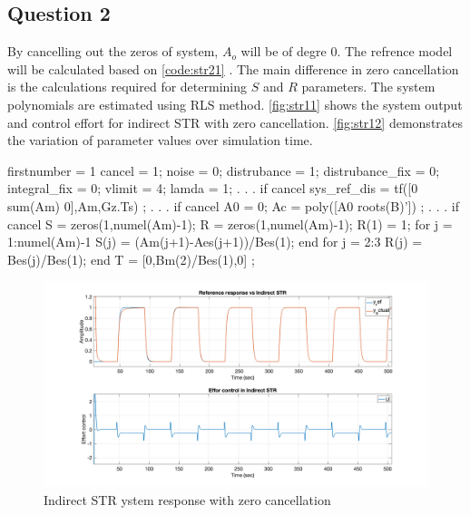 \FloatBarrier
\subsection{Question 2}
By cancelling out the zeros of system,  $A_o $ will be of degre  $0$. The refrence model will be calculated based on 
\autoref{code:str21} . The main difference in zero cancellation is the calculations required for determining $S$ and $R$ parameters. The system polynomials are estimated using RLS method. \autoref{fig:str11} shows the system output and control effort for indirect STR with zero cancellation.  \autoref{fig:str12} demonstrates the variation of parameter values over simulation time.

\begin{code}
	\begin{matlabcode}{firstnumber = 1}
cancel = 1; %
noise = 0; %
distrubance = 1; %
distrubance_fix = 0; %
integral_fix = 0; %
vlimit = 4; %
lamda = 1;
. . .
if cancel
	sys_ref_dis = tf([0 sum(Am) 0],Am,Gz.Ts) ;
. . .
if cancel
	A0 = 0;
	Ac = poly([A0 roots(B)']) ;
. . .
if cancel
	S = zeros(1,numel(Am)-1);
	R = zeros(1,numel(Am)-1);
	R(1) = 1;
	for j = 1:numel(Am)-1
		S(j) = (Am(j+1)-Aes(j+1))/Bes(1);
	end
	for j = 2:3
		R(j) = Bes(j)/Bes(1);
	end
	T = [0,Bm(2)/Bes(1),0] ;
	\end{matlabcode}
	\label{code:str21}
\end{code}

\begin{figure}
	\centering
	\includegraphics[width=\textwidth]{images/str21.png}
	\caption{Indirect STR ystem response with zero cancellation}
	\label{fig:str21}
\end{figure}

